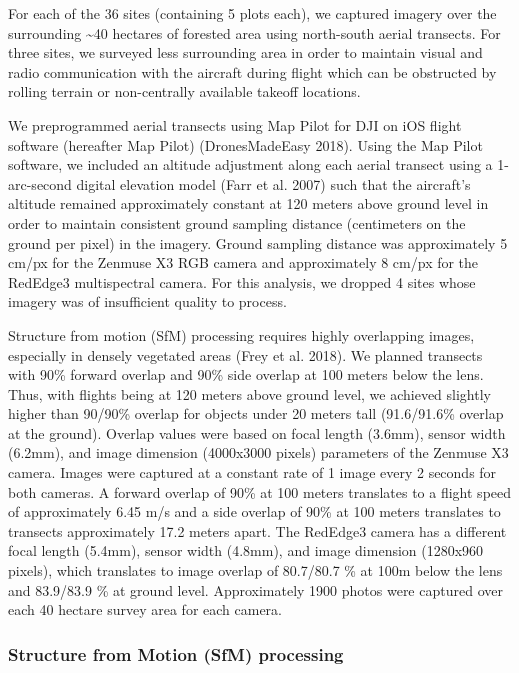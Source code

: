 \documentclass[]{article}
\begin{document}
For each of the 36 sites (containing 5 plots each), we captured imagery
over the surrounding \textasciitilde{}40 hectares of forested area using
north-south aerial transects. For three sites, we surveyed less
surrounding area in order to maintain visual and radio communication
with the aircraft during flight which can be obstructed by rolling
terrain or non-centrally available takeoff locations.

We preprogrammed aerial transects using Map Pilot for DJI on iOS flight
software (hereafter Map Pilot) (DronesMadeEasy 2018). Using the Map
Pilot software, we included an altitude adjustment along each aerial
transect using a 1-arc-second digital elevation model (Farr et al. 2007)
such that the aircraft's altitude remained approximately constant at 120
meters above ground level in order to maintain consistent ground
sampling distance (centimeters on the ground per pixel) in the imagery.
Ground sampling distance was approximately 5 cm/px for the Zenmuse X3
RGB camera and approximately 8 cm/px for the RedEdge3 multispectral
camera. For this analysis, we dropped 4 sites whose imagery was of
insufficient quality to process.

Structure from motion (SfM) processing requires highly overlapping
images, especially in densely vegetated areas (Frey et al. 2018). We
planned transects with 90\% forward overlap and 90\% side overlap at 100
meters below the lens. Thus, with flights being at 120 meters above
ground level, we achieved slightly higher than 90/90\% overlap for
objects under 20 meters tall (91.6/91.6\% overlap at the ground).
Overlap values were based on focal length (3.6mm), sensor width (6.2mm),
and image dimension (4000x3000 pixels) parameters of the Zenmuse X3
camera. Images were captured at a constant rate of 1 image every 2
seconds for both cameras. A forward overlap of 90\% at 100 meters
translates to a flight speed of approximately 6.45 m/s and a side
overlap of 90\% at 100 meters translates to transects approximately 17.2
meters apart. The RedEdge3 camera has a different focal length (5.4mm),
sensor width (4.8mm), and image dimension (1280x960 pixels), which
translates to image overlap of 80.7/80.7 \% at 100m below the lens and
83.9/83.9 \% at ground level. Approximately 1900 photos were captured
over each 40 hectare survey area for each camera.

\subsubsection{Structure from Motion (SfM)
processing}\label{structure-from-motion-sfm-processing}
\end{document}
